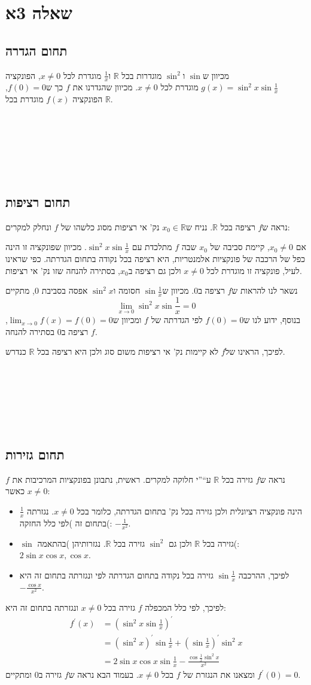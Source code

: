 \documentclass[11pt, oneside]{article}
\newcommand{\qed}{\R{$\blacksquare$}}
\newcommand{\br}{\\\\\\\\\\\\\\}
\newcommand{\mR}{\mathbb{R}}
\newcommand{\m}[3]{\R{משפט #3#2.#1}}
\begin{document}
\section*{שאלה 3א}
\subsection*{תחום הגדרה}
מכיוון ש$\sin$ ו$\sin^{2}$ מוגדרות בכל $\mR$ ו$\frac{1}{x}$ מוגדרת לכל $x \neq 0$, הפונקציה $g(x) = \sin^{2}x\sin\frac{1}{x}$ מוגדרת לכל $x \neq 0$. מכיוון שהגדרנו את $f$ כך ש$f(0) = 0$, הפונקציה $f(x)$ מוגדרת בכל $\mR$.
\br\qed

\subsection*{תחום רציפות}
נראה ש$f$ רציפה בכל $\mR$. נניח ש$x_{0} \in \mR$ נק' אי רציפות מסוג כלשהו של $f$ ונחלק למקרים:

אם $x_{0} \neq 0$, קיימת סביבה של $x_{0}$ שבה $f$ מתלכדת עם $\sin^{2}x\sin\frac{1}{x}$. מכיוון שפונקציה זו הינה כפל של הרכבה של פונקציות אלמנטריות, היא רציפה בכל נקודה בתחום הגדרתה. כפי שראינו לעיל, פונקציה זו מוגדרת לכל $x \neq 0$ ולכן גם רציפה ב$x_{0}$, בסתירה להנחה שזו נק' אי רציפות.

נשאר לנו להראות ש$f$ רציפה ב0. מכיוון ש$\sin\frac{1}{x}$ חסומה ו$\sin^{2}x$ אפסה בסביבת 0, מתקיים
\[
\lim_{x \to 0} \sin^{2}x\sin\frac{1}{x} = 0
\]
בנוסף, ידוע לנו ש$f(0) = 0$ לפי הגדרתה של $f$ ומכיוון ש$\lim_{x \to 0} f(x) = f(0) = 0$, $f$ רציפה ב0 בסתירה להנחה.

לפיכך, הראינו של$f$ לא קיימות נק' אי רציפות משום סוג ולכן היא רציפה בכל $\mR$ כנדרש.
\br\qed

\subsection*{תחום גזירות}
נראה ש$f$ גזירה בכל $\mR$ ע``''י חלוקה למקרים. ראשית, נתבונן בפונקציות המרכיבות את $f$ כאשר $x \neq 0$:
\begin{itemize}
\item $\frac{1}{x}$ הינה פונקציה רציונלית ולכן גזירה בכל נק' בתחום הגדרתה, כלומר בכל $x \neq 0$. נגזרתה בתחום זה )לפי כלל החזקה(: $-\frac{1}{x^{2}}$.
\item $\sin$ גזירה בכל $\mR$ ולכן גם $\sin^{2}$ גזירה בכל $\mR$. נגזרותיהן )בהתאמה(: $2\sin{x}\cos{x}, \cos{x}$.
\item לפיכך, ההרכבה $\sin\frac{1}{x}$ גזירה בכל נקודה בתחום הגדרתה לפי \m{7}{12}{} ונגזרתה בתחום זה היא $-\frac{\cos{x}}{x^{2}}$.
\end{itemize}
לפיכך, לפי כלל המכפלה $f$ גזירה בכל $x \neq 0$ ונגזרתה בתחום זה היא:
\begin{align*}
f^{\prime}(x)
&= \left(\sin^{2}x\sin\frac{1}{x}\right)^{\prime}\\
&= (\sin^{2}x)^{\prime}\sin\frac{1}{x} + \left(\sin\frac{1}{x}\right)^{\prime}\sin^{2}x\\
&= 2\sin{x}\cos{x}\sin\frac{1}{x} - \frac{\cos\frac{1}{x}\sin^{2}x}{x^{2}}
\end{align*}
ומצאנו את הנגזרת של $f$ בכל $x \neq 0$. בעמוד הבא נראה ש$f$ גזירה ב0 ומתקיים $f^{\prime}(0) = 0$.
\clearpage
\end{document}
